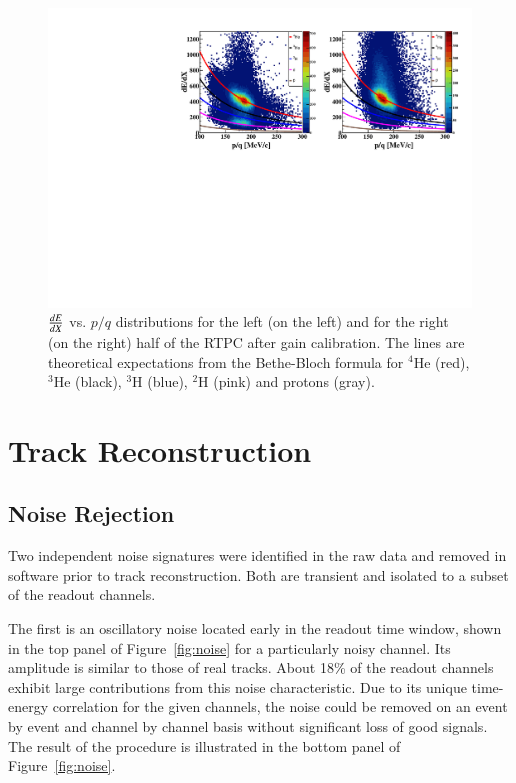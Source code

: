 \documentclass[preprint,5p]{elsarticle}
\begin{document}
\begin{figure}[!h]
\centering
\includegraphics[scale=0.73]{f_dedx_p_exp_2nd.pdf}
\caption{$\small{\frac{dE}{dX}}$ vs. $p/q$ distributions for the left (on the 
   left) and for the right (on the right) half of the RTPC after gain 
   calibration. The lines are theoretical expectations from the Bethe-Bloch 
   formula for $^4$He 
   (red), $^3$He (black), $^3$H (blue), $^2$H (pink) and protons (gray).}
\label{fig:dedx_p_exp_2nd}
\end{figure}

\section{Track Reconstruction}
\label{sec_tracking}

\subsection{Noise Rejection}
Two independent noise signatures were identified in the raw data and removed 
in software prior to track reconstruction. Both are transient and isolated to 
a subset of the readout channels. 

The first is an oscillatory noise located early in the readout time window, 
shown in the top panel of Figure~\ref{fig:noise} for a particularly noisy 
channel.  Its amplitude is similar to those of real tracks. About 18\% of the 
readout channels exhibit large contributions from this noise characteristic.  
Due to its unique time-energy correlation for the given channels, the noise 
could be removed on an event by event and channel by channel basis without 
significant loss of good signals. The result of the
procedure is illustrated in the bottom panel of Figure~\ref{fig:noise}.
\end{document}
